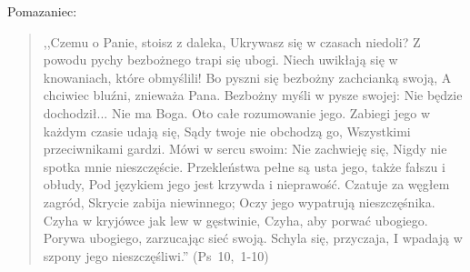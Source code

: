 \documentclass[10pt,a4paper,oneside]{article}
\begin{document}
Pomazaniec:
\begin{quote}
,,Czemu o Panie, stoisz z daleka, Ukrywasz się w czasach niedoli? Z powodu pychy bezbożnego trapi się ubogi. Niech uwikłają się w knowaniach, które obmyślili! Bo pyszni się bezbożny zachcianką swoją, A chciwiec bluźni, znieważa Pana. Bezbożny myśli w pysze swojej: Nie będzie dochodził... Nie ma Boga. Oto całe rozumowanie jego. Zabiegi jego w każdym czasie udają się, Sądy twoje nie obchodzą go, Wszystkimi przeciwnikami gardzi. Mówi w sercu swoim: Nie zachwieję się, Nigdy nie spotka mnie nieszczęście. Przekleństwa pełne są usta jego, także fałszu i obłudy, Pod językiem jego jest krzywda i nieprawość. Czatuje za węgłem zagród, Skrycie zabija niewinnego; Oczy jego wypatrują nieszczęśnika. Czyha w kryjówce jak lew w gęstwinie, Czyha, aby porwać ubogiego. Porywa ubogiego, zarzucając sieć swoją. Schyla się, przyczaja, I wpadają w szpony jego nieszczęśliwi.'' \mbox{(Ps 10, 1-10)}
\end{quote}
\end{document}

